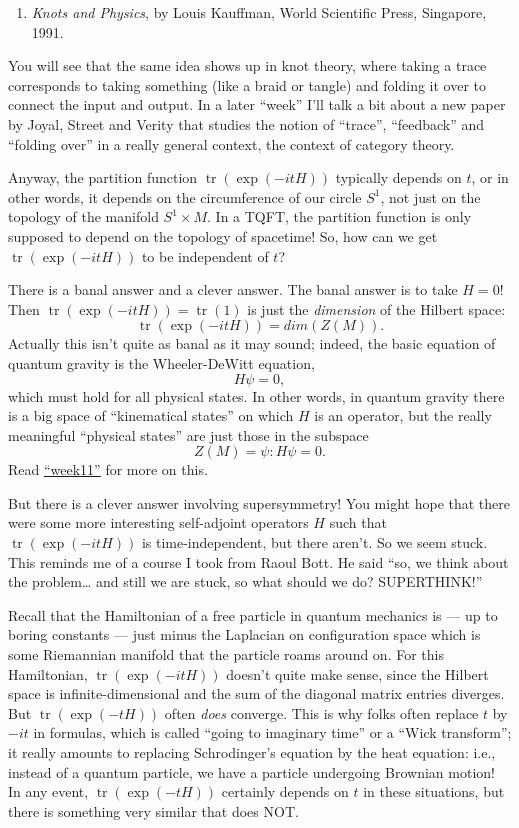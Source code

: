 \documentclass{article}
\def\tightlist{}
\begin{document}
\begin{enumerate}
\def\labelenumi{\arabic{enumi})}
\setcounter{enumi}{3}
\tightlist
\item
  \emph{Knots and Physics}, by Louis Kauffman, World Scientific Press,
  Singapore, 1991.
\end{enumerate}

You will see that the same idea shows up in knot theory, where taking a
trace corresponds to taking something (like a braid or tangle) and
folding it over to connect the input and output. In a later ``week''
I'll talk a bit about a new paper by Joyal, Street and Verity that
studies the notion of ``trace'', ``feedback'' and ``folding over'' in a
really general context, the context of category theory.

Anyway, the partition function \(\operatorname{tr}(\exp(-itH))\)
typically depends on \(t\), or in other words, it depends on the
circumference of our circle \(S^1\), not just on the topology of the
manifold \(S^1\times M\). In a TQFT, the partition function is only
supposed to depend on the topology of spacetime! So, how can we get
\(\operatorname{tr}(\exp(-itH))\) to be independent of \(t\)?

There is a banal answer and a clever answer. The banal answer is to take
\(H = 0\)! Then \(\operatorname{tr}(\exp(-itH)) = \operatorname{tr}(1)\)
is just the \emph{dimension} of the Hilbert space:
\[\operatorname{tr}(\exp(-itH)) = dim(Z(M)).\] Actually this isn't quite
as banal as it may sound; indeed, the basic equation of quantum gravity
is the Wheeler-DeWitt equation, \[H \psi = 0,\] which must hold for all
physical states. In other words, in quantum gravity there is a big space
of ``kinematical states'' on which \(H\) is an operator, but the really
meaningful ``physical states'' are just those in the subspace
\[Z(M) = {\psi: H \psi = 0}.\] Read
\protect\hyperlink{week11}{``week11''} for more on this.

But there is a clever answer involving supersymmetry! You might hope
that there were some more interesting self-adjoint operators \(H\) such
that \(\operatorname{tr}(\exp(-itH))\) is time-independent, but there
aren't. So we seem stuck. This reminds me of a course I took from Raoul
Bott. He said ``so, we think about the problem\ldots{} and still we are
stuck, so what should we do? SUPERTHINK!''

Recall that the Hamiltonian of a free particle in quantum mechanics is
--- up to boring constants --- just minus the Laplacian on configuration
space which is some Riemannian manifold that the particle roams around
on. For this Hamiltonian, \(\operatorname{tr}(\exp(-itH))\) doesn't
quite make sense, since the Hilbert space is infinite-dimensional and
the sum of the diagonal matrix entries diverges. But
\(\operatorname{tr}(\exp(-tH))\) often \emph{does} converge. This is why
folks often replace \(t\) by \(-it\) in formulas, which is called
``going to imaginary time'' or a ``Wick transform''; it really amounts
to replacing Schrodinger's equation by the heat equation: i.e., instead
of a quantum particle, we have a particle undergoing Brownian motion! In
any event, \(\operatorname{tr}(\exp(-tH))\) certainly depends on \(t\)
in these situations, but there is something very similar that does NOT.
\end{document}
